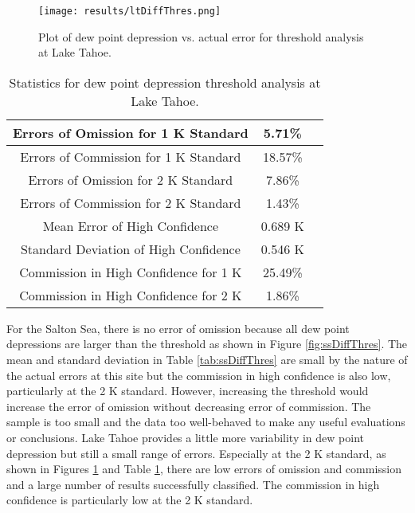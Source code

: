 \documentclass{book}
\begin{document}
\begin{minipage}[c]{0.47\textwidth}
\centering
\begin{figure}[H]
\texttt{[image: results/ltDiffThres.png]}
\caption{Plot of dew point depression vs. actual error for threshold analysis at Lake Tahoe.}
\label{fig:ltDiffThres}
\end{figure}
\end{minipage}
\begin{minipage}[c]{0.47\textwidth}
\begin{table}[H]
\centering
\footnotesize
\begin{tabular}{ | c | c | c | } \hline
Errors of Omission for 1 K Standard & 5.71\% \\ \hline
Errors of Commission for 1 K Standard & 18.57\% \\ \hline
Errors of Omission for 2 K Standard & 7.86\% \\ \hline
Errors of Commission for 2 K Standard & 1.43\% \\ \hline
Mean Error of High Confidence & 0.689 K \\ \hline
Standard Deviation of High Confidence & 0.546 K \\ \hline
Commission in High Confidence for 1 K & 25.49\% \\ \hline
Commission in High Confidence for 2 K & 1.86\% \\ \hline
\end{tabular}
\caption{Statistics for dew point depression threshold analysis at Lake Tahoe.}
\label{tab:ltDiffThres}
\end{table}
\end{minipage}

For the Salton Sea, there is no error of omission because all dew point depressions are larger than the threshold as shown in Figure \ref{fig:ssDiffThres}.  The mean and standard deviation in Table \ref{tab:ssDiffThres} are small by the nature of the actual errors at this site but the commission in high confidence is also low, particularly at the 2 K standard.  However, increasing the threshold would increase the error of omission without decreasing error of commission.  The sample is too small and the data too well-behaved to make any useful evaluations or conclusions.  Lake Tahoe provides a little more variability in dew point depression but still a small range of errors.  Especially at the 2 K standard, as shown in Figures \ref{fig:ltDiffThres} and Table \ref{tab:ltDiffThres}, there are low errors of omission and commission and a large number of results successfully classified.  The commission in high confidence is particularly low at the 2 K standard.
\end{document}
